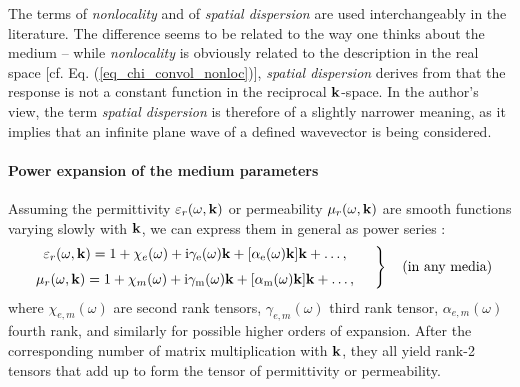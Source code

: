 The terms of \textit{nonlocality} and of \textit{spatial dispersion} are used interchangeably in the literature. The difference seems to be related to the way one thinks about the medium -- while \textit{nonlocality} is obviously related to the description in the real space [cf. Eq. (\ref{eq_chi_convol_nonloc})], \textit{spatial dispersion} derives from that the response is not a constant function in the reciprocal ${\mathbf{k}}$-space. In the author's view, the term \textit{spatial dispersion} is therefore of a slightly narrower meaning, as it implies that an infinite plane wave of a defined wavevector is being considered.

\paragraph{Power expansion of the medium parameters} %
Assuming the permittivity $\varepsilon_r(\omega,{\mathbf{k}})$ or permeability $\mu_r(\omega,{\mathbf{k}})$ are smooth functions varying slowly with ${\mathbf{k}}$, we can express them in general as power series \cite[p. 367]{landau1984electrodynamics}:
\begin{equation} 
\left.  \begin{array}{c}
\epsrn(\omega,\kk) = 1 + \chi_e(\omega) + \ii \gamma_{\text{e}}(\omega) \kk + [\alpha_{\text{e}}(\omega) \kk] \kk + \ldots, \medskip  \\
\murn(\omega,\kk) = 1 + \chi_m(\omega) + \ii \gamma_{\text{m}}(\omega) \kk + [\alpha_{\text{m}}(\omega) \kk] \kk + \ldots, 
\end{array} \quad \right\} \quad \text{(in any media)}
\label{eq_epsmusd1}\end{equation} %
where $\chi_{e,m}(\omega)$ are second rank tensors, $\gamma_{e,m}(\omega)$ third rank tensor, $\alpha_{e,m}(\omega)$ fourth rank, and similarly for possible higher orders of expansion. After the corresponding number of matrix multiplication with ${\mathbf{k}}$, they all yield rank-2 tensors that add up to form the tensor of permittivity or permeability.

